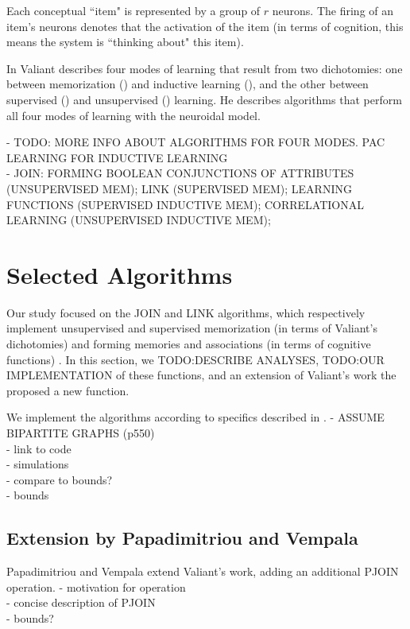 \documentclass[letterpaper, 12pt]{article}
\begin{document}
Each conceptual ``item" is represented by a group of $r$ neurons. The firing of an item's neurons denotes that the activation of the item (in terms of cognition, this means the system is ``thinking about" this item).

In \cite{valiant_circuits_1994} Valiant describes four modes of learning that result from two dichotomies: one between memorization () and inductive learning (), and the other between supervised () and unsupervised () learning. He describes algorithms that perform all four modes of learning with the neuroidal model. 

- TODO: MORE INFO ABOUT ALGORITHMS FOR FOUR MODES. PAC LEARNING FOR INDUCTIVE LEARNING\\
- JOIN: FORMING BOOLEAN CONJUNCTIONS OF ATTRIBUTES (UNSUPERVISED MEM); LINK (SUPERVISED MEM); LEARNING FUNCTIONS (SUPERVISED INDUCTIVE MEM); CORRELATIONAL LEARNING (UNSUPERVISED INDUCTIVE MEM);

\section{Selected Algorithms}\label{sec:selected_algorithms}
Our study focused on the JOIN and LINK algorithms, which respectively implement unsupervised and supervised memorization (in terms of Valiant's dichotomies) and forming memories and associations (in terms of cognitive functions) \cite{valiant_circuits_1994, papadimitriou_cortical_2015}. In this section, we TODO:DESCRIBE ANALYSES, TODO:OUR IMPLEMENTATION of these functions, and an extension of Valiant's work the proposed a new function.

We implement the algorithms according to specifics described in \cite{valiant_memorization_2005}.
- ASSUME BIPARTITE GRAPHS (p550)\\
- link to code\\
- simulations\\
- compare to bounds?\\
- bounds\\

\subsection{Extension by Papadimitriou and Vempala}\label{sec:pjoin}
Papadimitriou and Vempala \cite{papadimitriou_cortical_2015} extend Valiant's work, adding an additional PJOIN operation.
- motivation for operation\\
- concise description of PJOIN\\
- bounds?\\
\end{document}
